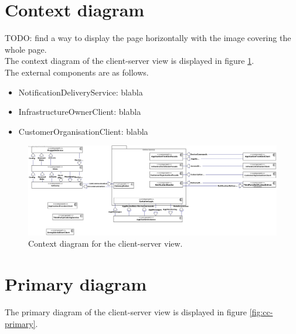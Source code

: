 
\showcsnotes{}

\section{Context diagram}
    TODO: find a way to display the page horizontally with the image covering the whole page. \\

    The context diagram of the client-server view is displayed in figure \ref{fig:cc-context}. \\

    The external components are as follows.
    \begin{itemize}
        \item NotificationDeliveryService: blabla
        \item InfrastructureOwnerClient: blabla
        \item CustomerOrganisationClient: blabla
    \end{itemize}


    \begin{figure}[!htp]
    	\centering
    	\includegraphics[width=\textwidth]{images/component-CONTEXT}
    	\caption{Context diagram for the client-server view.}\label{fig:cc-context}
    \end{figure}

\section{Primary diagram}
    The primary diagram of the client-server view is displayed in figure \ref{fig:cc-primary}. \\

